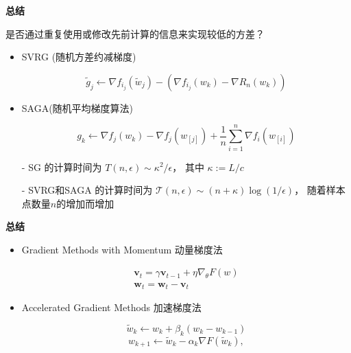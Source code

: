\documentclass[handout]{beamer}
\begin{document}
\begin{frame}
{\textbf{总结}}

 { \color{dred}{梯度聚合算法}}

是否通过重复使用或修改先前计算的信息来实现较低的方差？


\begin{itemize}
  \item SVRG (随机方差约减梯度)

  $$
  \tilde{{g}}_j \leftarrow \nabla f_{i_j}\left(\tilde{{w}}_j\right)-\left(\nabla f_{i_j}\left({w}_k\right)-\nabla R_n\left({w}_k\right)\right)
  $$
 
  \item SAGA(随机平均梯度算法)

$$
g_k \leftarrow \nabla f_j\left(w_k\right)-\nabla f_j\left(w_{[j]}\right)+\frac{1}{n} \sum_{i=1}^n \nabla f_i\left(w_{[i]}\right)
$$

\end{itemize}

\begin{itemize}
  \item[-] SG 的计算时间为 $T(n, \epsilon) \sim \kappa^{2} / \epsilon$，
  其中 $\kappa:=L / c$
  \item[-] SVRG和SAGA 的计算时间为
  $\mathcal{T}(n, \epsilon) \sim(n+\kappa) \log (1 / \epsilon)$，
  随着样本点数量$n$的增加而增加
\end{itemize}

\end{frame}

\begin{frame}
{\textbf{总结}}

 { \color{dred}{其他流行优化算法}}

 \begin{itemize}
  \item Gradient Methods with Momentum 动量梯度法

 $$
\begin{array}{l}
\mathbf{v}_t=\gamma \mathbf{v}_{t-1}+\eta \nabla_\theta F(w) \\
\mathbf{w}_t=\mathbf{w}_t-\mathbf{v}_t
\end{array}
$$
  \item Accelerated Gradient Methods 加速梯度法
  
  $$
  \tilde{w}_{k} \leftarrow w_{k}+\beta_{k}\left(w_{k}-w_{k-1}\right)
  $$
  $$
  w_{k+1} \leftarrow \tilde{w}_{k}-\alpha_{k} \nabla F\left(\tilde{w}_{k}\right),
  $$
\end{itemize}
\end{frame}
\end{document}
